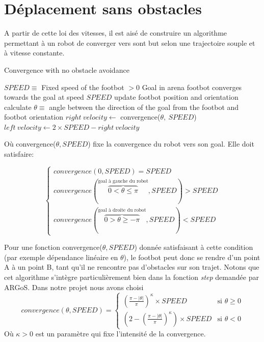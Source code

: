 \section{Déplacement sans obstacles}

A partir de cette loi des vitesses, il est aisé de construire un algorithme permettant à un robot de converger vers sont but selon une trajectoire souple et à vitesse constante.

\begin{algorithm}
\caption{Convergence with no obstacle avoidance}
\label{simpleConvergence}
\begin{algorithmic}
  \REQUIRE \(SPEED \equiv \) Fixed speed of the footbot \(> 0\)
  \REQUIRE Goal in arena
  \ENSURE footbot converges towards the goal at speed \(SPEED\)
    \STATE update footbot position and orientation
    \STATE calculate \( \theta \equiv\) angle between the direction of the goal from the footbot and footbot orientation
    \STATE \( right\:velocity \gets\) convergence(\(\theta,\:SPEED\))
    \STATE \( left\:velocity \gets 2 \times SPEED-right\:velocity\) 
  \ENDWHILE
\end{algorithmic}
\end{algorithm}

Où convergence($\theta, SPEED$) fixe la convergence du robot vers son goal. Elle doit satisfaire:

\begin{equation}
  \begin{cases}
    convergence(0,SPEED)=SPEED\\
    convergence(\overset{\text{goal à gauche du robot}}{\overbrace{0<\theta\leq\pi}},SPEED)>SPEED\\
    convergence(\overset{\text{goal à droite du robot}}{\overbrace{0>\theta\geq-\pi}},SPEED)<SPEED
  \end{cases}
\end{equation}

Pour une fonction convergence($\theta, SPEED$) donnée satisfaisant à cette condition (par exemple dépendance linéaire en \(\theta\)), le footbot peut donc se rendre d'un point A à un point B, tant qu'il ne rencontre pas d'obstacles sur son trajet. Notons que cet algorithme s'intègre particulièrement bien dans la fonction \emph{step} demandée par ARGoS. Dans notre projet nous avons choisi
\[
convergence(\theta, SPEED)=
\begin{cases}
      { \left( \frac{\pi- \lvert \theta \rvert }{\pi} \right)}^{\kappa} \times SPEED & \text{si } \theta \geq 0\\
      \left( 2 - { \left( \frac{\pi- \lvert \theta \rvert }{\pi} \right) }^{\kappa} \right) \times SPEED & \text{si } \theta < 0
\end{cases}
\]
Où $\kappa > 0$ est un paramètre qui fixe l'intensité de la convergence.

